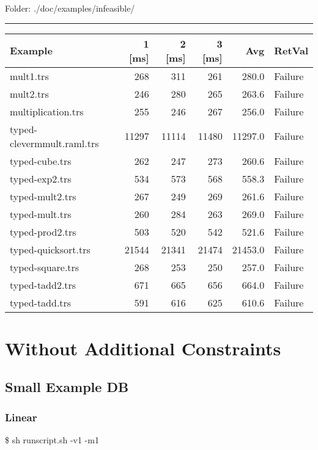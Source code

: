 \documentclass[11pt]{article}
\begin{document}
Folder: ./doc/examples/infeasible/

\rule{\linewidth}{0.5pt}

\begin{center}
\begin{tabular}{lrrrrl}
\hline
Example & 1 [ms] & 2 [ms] & 3 [ms] & Avg & RetVal\\
\hline
mult1.trs & 268 & 311 & 261 & 280.0 & Failure\\
mult2.trs & 246 & 280 & 265 & 263.6 & Failure\\
multiplication.trs & 255 & 246 & 267 & 256.0 & Failure\\
typed-clevermmult.raml.trs & 11297 & 11114 & 11480 & 11297.0 & Failure\\
typed-cube.trs & 262 & 247 & 273 & 260.6 & Failure\\
typed-exp2.trs & 534 & 573 & 568 & 558.3 & Failure\\
typed-mult2.trs & 267 & 249 & 269 & 261.6 & Failure\\
typed-mult.trs & 260 & 284 & 263 & 269.0 & Failure\\
typed-prod2.trs & 503 & 520 & 542 & 521.6 & Failure\\
typed-quicksort.trs & 21544 & 21341 & 21474 & 21453.0 & Failure\\
typed-square.trs & 268 & 253 & 250 & 257.0 & Failure\\
typed-tadd2.trs & 671 & 665 & 656 & 664.0 & Failure\\
typed-tadd.trs & 591 & 616 & 625 & 610.6 & Failure\\
\hline
\end{tabular}

\end{center}


\section{Without Additional Constraints}
\label{sec:org4878566}

\subsection{Small Example DB}
\label{sec:orgce757ba}

\subsubsection{Linear}
\label{sec:org989cefd}

\$ sh runscript.sh -v1 -m1
\end{document}
